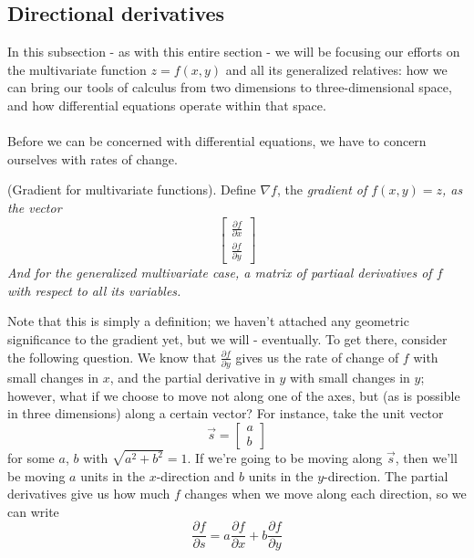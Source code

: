 \documentclass{article}
\begin{document}
\subsection{Directional derivatives}
In this subsection - as with this entire section - we will be focusing our efforts on the multivariate function $z=f(x,y)$ and all its generalized relatives: how we can bring our tools of calculus from two dimensions to three-dimensional space, and how differential equations operate within that space.\\ \\
 Before we can be concerned with differential equations, we have to concern ourselves with rates of change.
 \begin{definition}
    (Gradient for multivariate functions). Define $\nabla f$, the \it gradient \normalfont of $f(x,y)=z$, as the vector
    \begin{equation*}
        \begin{bmatrix}
            \frac{\partial f}{\partial x} \\
            \frac{\partial f}{\partial y}
        \end{bmatrix}
    \end{equation*}
    And for the generalized multivariate case, a matrix of partiaal derivatives of $f$ with respect to all its variables.
 \end{definition}
 Note that this is simply a definition; we haven't attached any geometric significance to the gradient yet, but we will - eventually. To get there, consider the following question. We know that $\frac{\partial f}{\partial y}$ gives us the rate of change of $f$ with small changes in $x$, and the partial derivative in $y$ with small changes in $y$; however, what if we choose to move not along one of the axes, but (as is possible in three dimensions) along a certain vector? For instance, take the unit vector
 \begin{equation*}
    \vec{s} = \begin{bmatrix}
        a \\ b
    \end{bmatrix}
 \end{equation*}
 for some $a$, $b$ with $\sqrt{a^2+b^2}=1$. If we're going to be moving along $\vec{s}$, then we'll be moving $a$ units in the $x$-direction and $b$ units in the $y$-direction. The partial derivatives give us how much $f$ changes when we move along each direction, so we can write 
 \begin{equation*}
    \frac{\partial f}{\partial s} = a\frac{\partial f}{\partial x} + b\frac{\partial f}{\partial y}
 \end{equation*}
\end{document}
